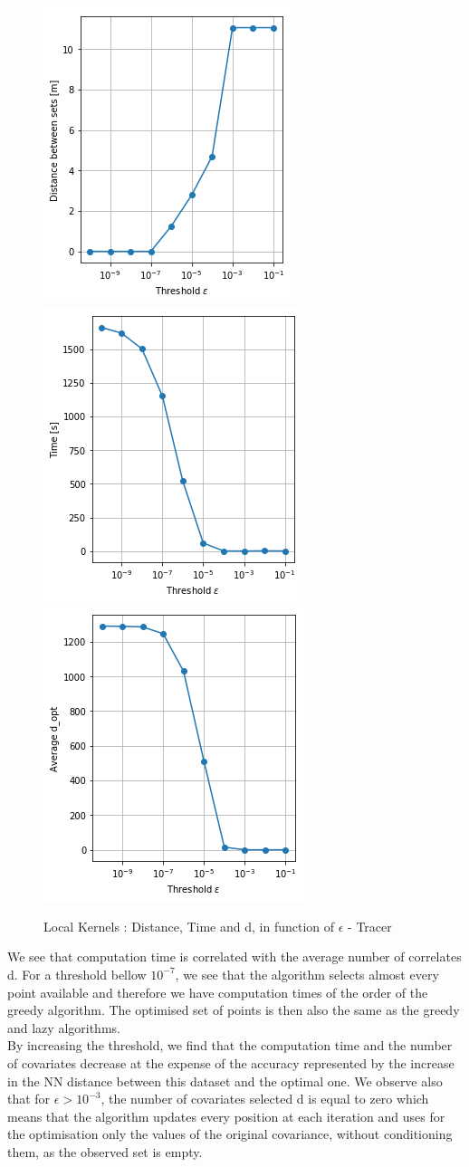 \begin{figure}[h]
\centering
\includegraphics[height=0.33\linewidth]{figures/CompAlg/3rd/non_centered_60.35.0/comp_dist}
~
\includegraphics[height=0.33\linewidth]{figures/CompAlg/3rd/non_centered_60.35.0/comp_Time}
~
\includegraphics[height=0.33\linewidth]{figures/CompAlg/3rd/non_centered_60.35.0/comp_d_opt}
\caption{Local Kernels : Distance, Time and d, in function of $\epsilon$ - Tracer}
\label{fig:comp:results}
\end{figure}

We see that computation time is correlated with the average number of correlates d. For a threshold bellow $10^{-7}$, we see that the algorithm selects almost every point available and therefore we have computation times of the order of the greedy algorithm. The optimised set of points is then also the same as the greedy and lazy algorithms.\\

By increasing the threshold, we find that the computation time and the number of covariates decrease at the expense of the accuracy represented by the increase in the NN distance between this dataset and the optimal one. We observe also that for $\epsilon > 10^{-3}$, the number of covariates selected d is equal to zero which means that the algorithm updates every position at each iteration and uses for the optimisation only the values of the original covariance, without conditioning them, as the observed set is empty.  \\

